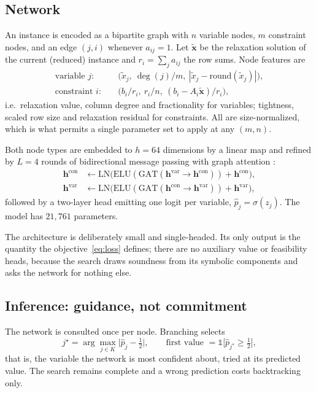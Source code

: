 \documentclass[final,5p,times,twocolumn]{elsarticle}
\begin{document}
\subsection{Network}
\label{sec:method-net}

An instance is encoded as a bipartite graph with $n$ variable nodes, $m$ constraint nodes, and an edge $(j,i)$ whenever $a_{ij}=1$. Let $\tilde{\mathbf{x}}$ be the relaxation solution of the current (reduced) instance and $r_i = \sum_j a_{ij}$ the row sums. Node features are
\begin{align}
\text{variable } j:&\quad \big(\tilde{x}_j,\ \deg(j)/m,\ |\tilde{x}_j - \mathrm{round}(\tilde{x}_j)|\big),\\
\text{constraint } i:&\quad \big(b_i/r_i,\ r_i/n,\ (b_i - A_i\tilde{\mathbf{x}})/r_i\big),
\end{align}
i.e.\ relaxation value, column degree and fractionality for variables; tightness, scaled row size and relaxation residual for constraints. All are size-normalized, which is what permits a single parameter set to apply at any $(m,n)$.

Both node types are embedded to $h=64$ dimensions by a linear map and refined by $L=4$ rounds of bidirectional message passing with graph attention \citep{velickovic2018graph}:
\begin{align}
\mathbf{h}^{\mathrm{con}} &\leftarrow \mathrm{LN}\big(\mathrm{ELU}(\mathrm{GAT}(\mathbf{h}^{\mathrm{var}}\!\to\!\mathbf{h}^{\mathrm{con}})) + \mathbf{h}^{\mathrm{con}}\big),\\
\mathbf{h}^{\mathrm{var}} &\leftarrow \mathrm{LN}\big(\mathrm{ELU}(\mathrm{GAT}(\mathbf{h}^{\mathrm{con}}\!\to\!\mathbf{h}^{\mathrm{var}})) + \mathbf{h}^{\mathrm{var}}\big),
\end{align}
followed by a two-layer head emitting one logit per variable, $\hat{p}_j = \sigma(z_j)$. The model has $21{,}761$ parameters.

The architecture is deliberately small and single-headed. Its only output is the quantity the objective~\eqref{eq:loss} defines; there are no auxiliary value or feasibility heads, because the search draws soundness from its symbolic components and asks the network for nothing else.

\subsection{Inference: guidance, not commitment}
\label{sec:method-inference}

The network is consulted once per node. Branching selects
\begin{equation}
j^\star = \arg\max_{j\in K} \big|\hat{p}_j - \tfrac12\big|,
\qquad
\text{first value } = \mathbb{1}\big[\hat{p}_{j^\star}\ge\tfrac12\big],
\end{equation}
that is, the variable the network is most confident about, tried at its predicted value. The search remains complete and a wrong prediction costs backtracking only.
\end{document}

